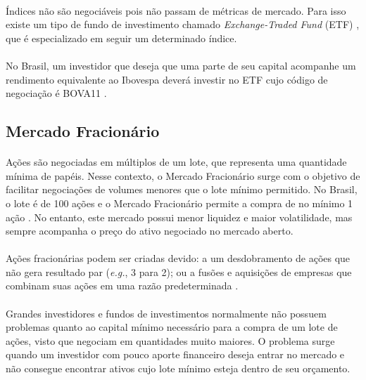 \paragraph{} Índices não são negociáveis pois não passam de métricas de mercado. Para isso existe um tipo de fundo de investimento chamado \textit{Exchange-Traded Fund} (ETF) \cite{etf}, que é especializado em seguir um determinado índice.

\paragraph{} No Brasil, um investidor que deseja que uma parte de seu capital acompanhe um rendimento equivalente ao Ibovespa deverá investir no ETF cujo código de negociação é BOVA11 \cite{etfs_listados}.



\FloatBarrier
\subsection{Mercado Fracionário}

\paragraph{} Ações são negociadas em múltiplos de um lote, que representa uma quantidade mínima de papéis. Nesse contexto, o Mercado Fracionário surge com o objetivo de facilitar negociações de volumes menores que o lote mínimo permitido. No Brasil, o lote é de 100 ações e o Mercado Fracionário permite a compra de no mínimo 1 ação \cite{mercado_fracionario}. No entanto, este mercado possui menor liquidez e maior volatilidade, mas sempre acompanha o preço do ativo negociado no mercado aberto.

\paragraph{} Ações fracionárias podem ser criadas devido: a um desdobramento de ações que não gera resultado par (\textit{e.g.}, 3 para 2); ou a fusões e aquisições de empresas que combinam suas ações em uma razão predeterminada \cite{mercado_fracionario}.

\paragraph{} Grandes investidores e fundos de investimentos normalmente não possuem problemas quanto ao capital mínimo necessário para a compra de um lote de ações, visto que negociam em quantidades muito maiores. O problema surge quando um investidor com pouco aporte financeiro deseja entrar no mercado e não consegue encontrar ativos cujo lote mínimo esteja dentro de seu orçamento.



